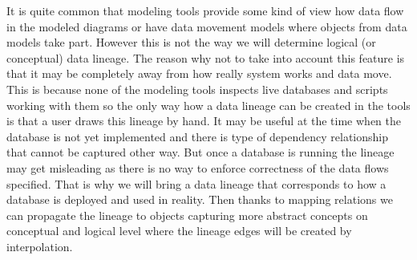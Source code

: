 It is quite common that modeling tools provide some kind of view how data flow in the modeled diagrams or have data movement models where objects from data models take part. 
However this is not the way we will determine logical (or conceptual) data lineage.
The reason why not to take into account this feature is that it may be completely away from how really system works and data move. This is because none of the modeling tools inspects live databases and scripts working with them so the only way how a data lineage can be created in the tools is that a user draws this lineage by hand. 
It may be useful at the time when the database is not yet implemented and there is type of dependency relationship that cannot be captured other way. But once a database is running the lineage may get misleading as there is no way to enforce correctness of the data flows specified.
That is why we will bring a data lineage that corresponds to how a database is deployed and used in reality. Then thanks to mapping relations we can propagate the lineage to objects capturing more abstract concepts on conceptual and logical level where the lineage edges will be created by interpolation.